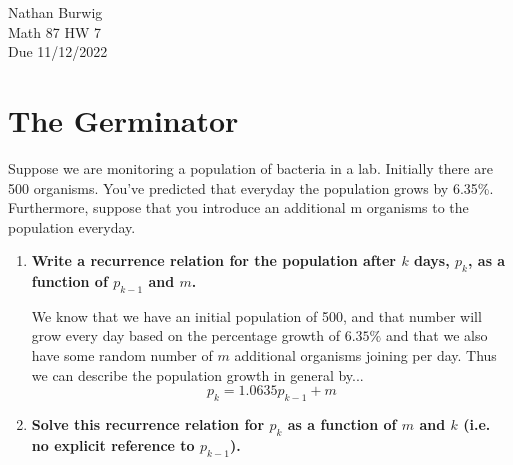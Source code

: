 \documentclass[11pt]{article}
\begin{document}
    \noindent Nathan Burwig \\
    Math 87 HW 7 \\
    Due 11/12/2022
    
    \hrulefill
    
    \section{The Germinator}

    Suppose we are monitoring a population of bacteria in a lab. Initially there 
    are 500 organisms. You’ve predicted that everyday the population grows by 
    6.35\%. Furthermore, suppose that you introduce an additional m organisms 
    to the population everyday.

    \begin{enumerate}
        \item \textbf{Write a recurrence relation for the population after $k$ 
            days, $p_k$, as a function of $p_{k-1}$ and $m$.}

            We know that we have an initial population of 500, and that number
            will grow every day based on the percentage growth of $6.35\%$ and
            that we also have some random number of $m$ additional organisms
            joining per day. Thus we can describe the population growth in
            general by...
            \[
                p_k = 1.0635p_{k-1} + m
            \] 
        \item \textbf{Solve this recurrence relation for $p_k$ as a function of $m$ 
            and $k$ (i.e. no explicit reference to $p_{k-1}$).}


\end{enumerate}
\end{document}
